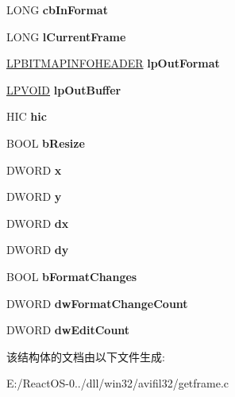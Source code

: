 \begin{DoxyCompactItemize}
L\+O\+NG {\bfseries cb\+In\+Format}
\item 
\mbox{\label{struct___i_get_frame_impl_a6f60b86b8b456508448ac511d847c79f}} 
L\+O\+NG {\bfseries l\+Current\+Frame}
\item 
\mbox{\label{struct___i_get_frame_impl_a890b6162d85a580914d262511c854674}} 
\hyperlink{struct_b_i_t_m_a_p_i_n_f_o_h_e_a_d_e_r}{L\+P\+B\+I\+T\+M\+A\+P\+I\+N\+F\+O\+H\+E\+A\+D\+ER} {\bfseries lp\+Out\+Format}
\item 
\mbox{\label{struct___i_get_frame_impl_af57be05202ee8e327040bb8d8fa1bb87}} 
\hyperlink{interfacevoid}{L\+P\+V\+O\+ID} {\bfseries lp\+Out\+Buffer}
\item 
\mbox{\label{struct___i_get_frame_impl_ad256e53e49833eb5681ff22498879d92}} 
H\+IC {\bfseries hic}
\item 
\mbox{\label{struct___i_get_frame_impl_af657ae1d5085fed6de71297cd0b946dc}} 
B\+O\+OL {\bfseries b\+Resize}
\item 
\mbox{\label{struct___i_get_frame_impl_a53f6d091581ea5e11e700baccdec6823}} 
D\+W\+O\+RD {\bfseries x}
\item 
\mbox{\label{struct___i_get_frame_impl_a66b1c7c77977f382ddf1d8523d23d518}} 
D\+W\+O\+RD {\bfseries y}
\item 
\mbox{\label{struct___i_get_frame_impl_ab9880f2e97e9f400f655afcb81e3ee48}} 
D\+W\+O\+RD {\bfseries dx}
\item 
\mbox{\label{struct___i_get_frame_impl_a3b3e282fe6c11a57942c1d80666e9fc0}} 
D\+W\+O\+RD {\bfseries dy}
\item 
\mbox{\label{struct___i_get_frame_impl_af22e9fa22fd2f654154b90e3b8ebab6c}} 
B\+O\+OL {\bfseries b\+Format\+Changes}
\item 
\mbox{\label{struct___i_get_frame_impl_a9809c8bd193ada33bb1700604fb68da7}} 
D\+W\+O\+RD {\bfseries dw\+Format\+Change\+Count}
\item 
\mbox{\label{struct___i_get_frame_impl_a567c078d7044de36d4b82e3bfd6cb9b1}} 
D\+W\+O\+RD {\bfseries dw\+Edit\+Count}
\end{DoxyCompactItemize}


该结构体的文档由以下文件生成\+:\begin{DoxyCompactItemize}
\item 
E\+:/\+React\+O\+S-\/0../dll/win32/avifil32/getframe.\+c\end{DoxyCompactItemize}

